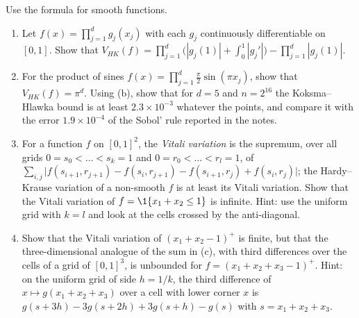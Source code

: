 \begin{exercise}\label{ex:qmc-variation}
\medium Use the formula  for smooth functions.
\begin{enumerate}[label=(\alph*)]
  \item Let $f(x)=\prod_{j=1}^dg_j(x_j)$ with each $g_j$ continuously differentiable on
    $[0,1]$. Show that
    $V_{HK}(f)=\prod_{j=1}^d\big(|g_j(1)|+\int_0^1|g_j'|\big)-\prod_{j=1}^d|g_j(1)|$.
  \item For the product of sines $f(x)=\prod_{j=1}^d\frac\pi2\sin(\pi x_j)$, show that
    $V_{HK}(f)=\pi^d$. Using (b), show that for $d=5$ and $n=2^{16}$
    the Koksma--Hlawka bound is at least $2.3\times10^{-3}$ whatever the points, and compare
    it with the error $1.9\times10^{-4}$ of the Sobol' rule reported in the notes.
  \item For a function $f$ on $[0,1]^2$, the \emph{Vitali variation} is the supremum, over all
    grids $0=s_0<\dots<s_k=1$ and $0=r_0<\dots<r_l=1$, of
    $\sum_{i,j}\big|f(s_{i+1},r_{j+1})-f(s_i,r_{j+1})-f(s_{i+1},r_j)+f(s_i,r_j)\big|$; the
    Hardy--Krause variation of a non-smooth $f$ is at least its Vitali variation. Show that the
    Vitali variation of $f=\1\{x_1+x_2\le1\}$ is infinite. Hint: use the uniform grid with
    $k=l$ and look at the cells crossed by the anti-diagonal.
  \item Show that the Vitali variation of $(x_1+x_2-1)^+$ is finite, but that the
    three-dimensional analogue of the sum in (c), with third differences over the cells of a
    grid of $[0,1]^3$, is unbounded for $f=(x_1+x_2+x_3-1)^+$. Hint: on the uniform grid of
    side $h=1/k$, the third difference of $x\mapsto g(x_1+x_2+x_3)$ over a cell with lower
    corner $x$ is $g(s+3h)-3g(s+2h)+3g(s+h)-g(s)$ with $s=x_1+x_2+x_3$.
\end{enumerate}
\end{exercise}

